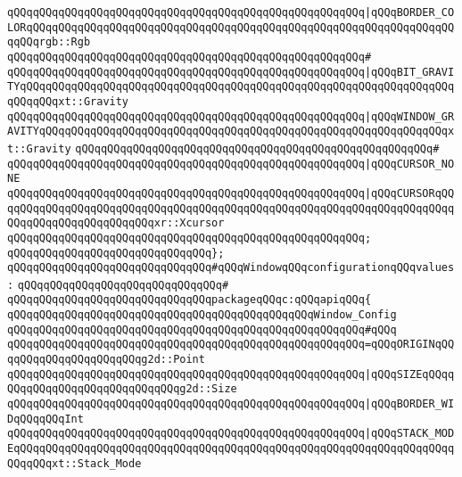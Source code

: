 \verb|qQQqqQQqqQQqqQQqqQQqqQQqqQQqqQQqqQQqqQQqqQQqqQQqqQQqqQQq|\verb#|qQQqBORDER_COLORqQQqqQQqqQQqqQQqqQQqqQQqqQQqqQQqqQQqqQQqqQQqqQQqqQQqqQQqqQQqqQQqqQQqqQQqrgb::Rgb#\newline
\verb|qQQqqQQqqQQqqQQqqQQqqQQqqQQqqQQqqQQqqQQqqQQqqQQqqQQqqQQq#|\newline
\verb|qQQqqQQqqQQqqQQqqQQqqQQqqQQqqQQqqQQqqQQqqQQqqQQqqQQqqQQq|\verb#|qQQqBIT_GRAVITYqQQqqQQqqQQqqQQqqQQqqQQqqQQqqQQqqQQqqQQqqQQqqQQqqQQqqQQqqQQqqQQqqQQqqQQqqQQqxt::Gravity#\newline
\verb|qQQqqQQqqQQqqQQqqQQqqQQqqQQqqQQqqQQqqQQqqQQqqQQqqQQqqQQq|\verb#|qQQqWINDOW_GRAVITYqQQqqQQqqQQqqQQqqQQqqQQqqQQqqQQqqQQqqQQqqQQqqQQqqQQqqQQqqQQqqQQqxt::Gravity#\newline
\verb|qQQqqQQqqQQqqQQqqQQqqQQqqQQqqQQqqQQqqQQqqQQqqQQqqQQqqQQq#|\newline
\verb|qQQqqQQqqQQqqQQqqQQqqQQqqQQqqQQqqQQqqQQqqQQqqQQqqQQqqQQq|\verb#|qQQqCURSOR_NONE#\newline
\verb|qQQqqQQqqQQqqQQqqQQqqQQqqQQqqQQqqQQqqQQqqQQqqQQqqQQqqQQq|\verb#|qQQqCURSORqQQqqQQqqQQqqQQqqQQqqQQqqQQqqQQqqQQqqQQqqQQqqQQqqQQqqQQqqQQqqQQqqQQqqQQqqQQqqQQqqQQqqQQqqQQqqQQqxr::Xcursor#\newline
\verb|qQQqqQQqqQQqqQQqqQQqqQQqqQQqqQQqqQQqqQQqqQQqqQQqqQQqqQQq;|\newline
\verb|qQQqqQQqqQQqqQQqqQQqqQQqqQQqqQQq};|\newline
\newline
\verb|qQQqqQQqqQQqqQQqqQQqqQQqqQQqqQQq#qQQqWindowqQQqconfigurationqQQqvalues:|\newline
\verb|qQQqqQQqqQQqqQQqqQQqqQQqqQQqqQQq#|\newline
\verb|qQQqqQQqqQQqqQQqqQQqqQQqqQQqqQQqpackageqQQqc:qQQqapiqQQq{|\newline
\newline
\verb|qQQqqQQqqQQqqQQqqQQqqQQqqQQqqQQqqQQqqQQqqQQqqQQqWindow_Config|\newline
\verb|qQQqqQQqqQQqqQQqqQQqqQQqqQQqqQQqqQQqqQQqqQQqqQQqqQQqqQQq#qQQq|\newline
\verb|qQQqqQQqqQQqqQQqqQQqqQQqqQQqqQQqqQQqqQQqqQQqqQQqqQQqqQQq=qQQqORIGINqQQqqQQqqQQqqQQqqQQqqQQqg2d::Point|\newline
\verb|qQQqqQQqqQQqqQQqqQQqqQQqqQQqqQQqqQQqqQQqqQQqqQQqqQQqqQQq|\verb#|qQQqSIZEqQQqqQQqqQQqqQQqqQQqqQQqqQQqqQQqg2d::Size#\newline
\verb|qQQqqQQqqQQqqQQqqQQqqQQqqQQqqQQqqQQqqQQqqQQqqQQqqQQqqQQq|\verb#|qQQqBORDER_WIDqQQqqQQqInt#\newline
\verb|qQQqqQQqqQQqqQQqqQQqqQQqqQQqqQQqqQQqqQQqqQQqqQQqqQQqqQQq|\verb#|qQQqSTACK_MODEqQQqqQQqqQQqqQQqqQQqqQQqqQQqqQQqqQQqqQQqqQQqqQQqqQQqqQQqqQQqqQQqqQQqqQQqqQQqxt::Stack_Mode#\newline
